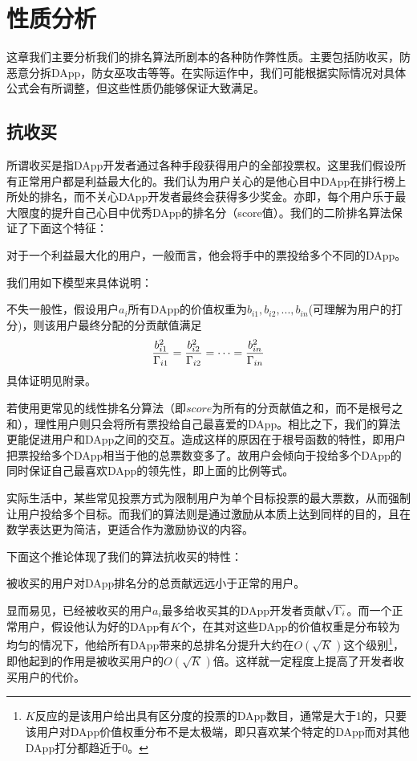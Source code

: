 \section{性质分析}
这章我们主要分析我们的排名算法所剧本的各种防作弊性质。主要包括防收买，防恶意分拆DApp，防女巫攻击等等。在实际运作中，我们可能根据实际情况对具体公式会有所调整，但这些性质仍能够保证大致满足。

\subsection{抗收买}
所谓收买是指DApp开发者通过各种手段获得用户的全部投票权。这里我们假设所有正常用户都是利益最大化的。我们认为用户关心的是他心目中DApp在排行榜上所处的排名，而不关心DApp开发者最终会获得多少奖金。亦即，每个用户乐于最大限度的提升自己心目中优秀DApp的排名分（score值）。我们的二阶排名算法保证了下面这个特征：

\begin{property}
	\label{p1}
	对于一个利益最大化的用户，一般而言，他会将手中的票投给多个不同的DApp。
\end{property}
我们用如下模型来具体说明：

不失一般性，假设用户$a_i$所有DApp的价值权重为$b_{i1},b_{i2},...,b_{in}$(可理解为用户的打分)，则该用户最终分配的分贡献值满足
$$\frac{b_{i1}^2}{\Gamma_{i1}}=\frac{b_{i2}^2}{\Gamma_{i2}}=\cdots=\frac{b_{in}^2}{\Gamma_{in}}$$
具体证明见附录。

若使用更常见的线性排名分算法（即$score$为所有的分贡献值之和，而不是根号之和），理性用户则只会将所有票投给自己最喜爱的DApp。相比之下，我们的算法更能促进用户和DApp之间的交互。造成这样的原因在于根号函数的特性，即用户把票投给多个DApp相当于他的总票数变多了。故用户会倾向于投给多个DApp的同时保证自己最喜欢DApp的领先性，即上面的比例等式。

实际生活中，某些常见投票方式为限制用户为单个目标投票的最大票数，从而强制让用户投给多个目标。而我们的算法则是通过激励从本质上达到同样的目的，且在数学表达更为简洁，更适合作为激励协议的内容。

下面这个推论体现了我们的算法抗收买的特性：
\begin{corollary}
被收买的用户对DApp排名分的总贡献远远小于正常的用户。
\end{corollary}
显而易见，已经被收买的用户$a_i$最多给收买其的DApp开发者贡献$\sqrt{\Gamma_i}$。而一个正常用户，假设他认为好的DApp有$K$个，在其对这些DApp的价值权重是分布较为均匀的情况下，他给所有DApp带来的总排名分提升大约在$O(\sqrt{K})$这个级别\footnote{$K$反应的是该用户给出具有区分度的投票的DApp数目，通常是大于1的，只要该用户对DApp价值权重分布不是太极端，即只喜欢某个特定的DApp而对其他DApp打分都趋近于0。}，即他起到的作用是被收买用户的$O(\sqrt{K})$倍。这样就一定程度上提高了开发者收买用户的代价。

